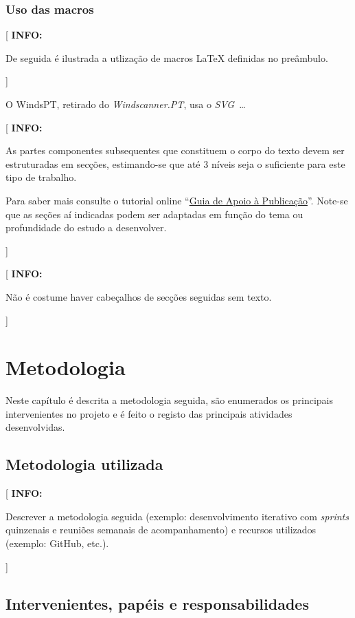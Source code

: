 \documentclass[11pt,a4paper]{report}
\newcommand{\windspt}{\textsf{WindsPT\/}}
\newcommand{\windscannerpt}{\emph{Windscanner.PT\/}}
\newcommand{\class}[1]{{\normalfont\slshape #1\/}}
\newcommand{\svg}{\class{SVG}}
\newenvironment{info}[1]{\vspace*{6mm}\color{blue}[ \textbf{INFO:} \begin{em} #1}
                        {\vspace*{3mm}\end{em} ]}
\begin{document}
\subsection*{Uso das macros}

\begin{info}
De seguida é ilustrada a utlização de macros \LaTeX{} definidas no
preâmbulo.
\end{info}

O \windspt, retirado do \windscannerpt, usa o \svg\ \ldots

\lipsum[9]

\begin{info}
As partes componentes subsequentes que constituem o corpo do texto
devem ser estruturadas em secções, estimando-se que até 3 níveis seja
o suficiente para este tipo de trabalho.

Para saber mais consulte o tutorial online 
``\href{https://docs.google.com/document/d/1TDC1behVq8x7fQL4CcPEEh_np5GXviJevQxnQ9gbiJs/edit}
{Guia de Apoio à Publicação}''.
Note-se que as seções aí indicadas podem ser adaptadas em função do tema
ou profundidade do estudo a desenvolver.
\end{info}

\begin{info}
Não é costume haver cabeçalhos de secções seguidas sem texto.
\end{info}


\chapter{Metodologia}

Neste capítulo é descrita a metodologia seguida, são enumerados os
principais intervenientes no projeto e é feito o registo das
principais atividades desenvolvidas.

\section{Metodologia utilizada}

\begin{info}
Descrever a metodologia seguida (exemplo: desenvolvimento iterativo
com \emph{sprints} quinzenais e reuniões semanais de acompanhamento) e
recursos utilizados (exemplo: GitHub, etc.).
\end{info}

\section{Intervenientes, papéis e responsabilidades}
\end{document}

